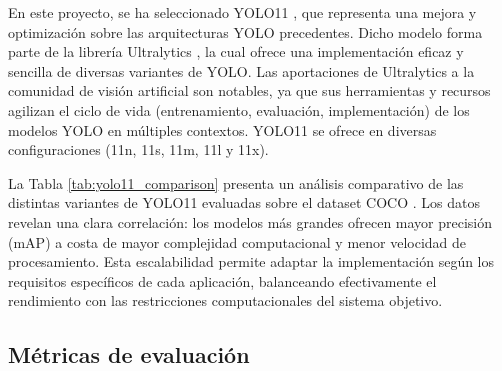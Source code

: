\documentclass[11pt,spanish,listoffigures,listoftables]{tfgetsinf}
\begin{document}
En este proyecto, se ha seleccionado YOLO11 \cite{yolo11_ultralytics}, que representa una mejora y optimización sobre las arquitecturas YOLO precedentes. Dicho modelo forma parte de la librería Ultralytics \cite{Jocher_Ultralytics_YOLO_2023}, la cual ofrece una implementación eficaz y sencilla de diversas variantes de YOLO. Las aportaciones de Ultralytics a la comunidad de visión artificial son notables, ya que sus herramientas y recursos agilizan el ciclo de vida (entrenamiento, evaluación, implementación) de los modelos YOLO en múltiples contextos. YOLO11 se ofrece en diversas configuraciones (11n, 11s, 11m, 11l y 11x).
\begin{table}[H]
   \centering
   \caption{Análisis comparativo de las variantes de YOLO11 considerando precisión, velocidad y complejidad computacional.}
   \label{tab:yolo11_comparison}
\end{table}

La Tabla \ref{tab:yolo11_comparison} presenta un análisis comparativo de las distintas variantes de YOLO11 evaluadas sobre el dataset COCO \cite{lin2015microsoftcococommonobjects}. Los datos revelan una clara correlación: los modelos más grandes ofrecen mayor precisión (mAP) a costa de mayor complejidad computacional y menor velocidad de procesamiento. Esta escalabilidad permite adaptar la implementación según los requisitos específicos de cada aplicación, balanceando efectivamente el rendimiento con las restricciones computacionales del sistema objetivo.

\subsection{Métricas de evaluación}
\end{document}
